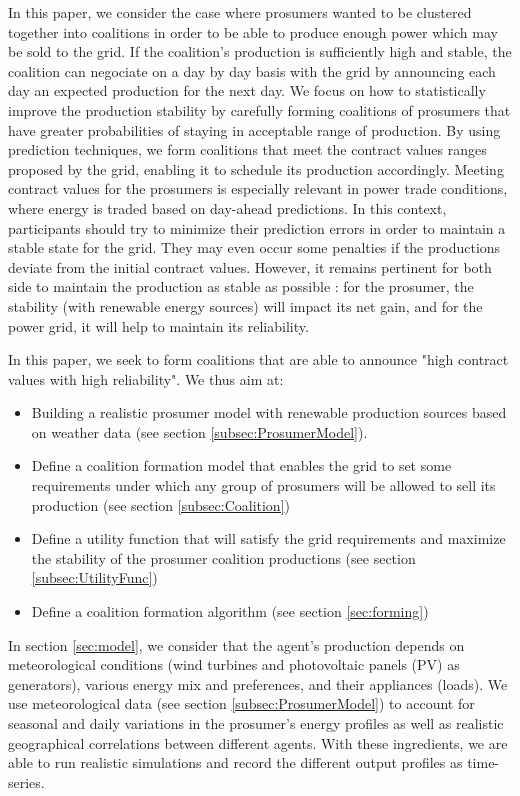 \documentclass[conference]{IEEEtran}
\begin{document}
In this paper, we consider the case where prosumers wanted to be clustered together into coalitions in order to be able to produce enough power which may be sold to the grid. If the coalition's production is sufficiently high and stable, the coalition can negociate on a day by day basis with the grid by announcing each day an expected production for the next day. We focus on how to statistically improve the production stability by carefully forming coalitions of prosumers that have greater probabilities of staying in acceptable range of production. By using prediction techniques, we form coalitions that meet the contract values ranges proposed by the grid, enabling it to schedule its production accordingly. Meeting contract values for the prosumers is especially relevant in power trade conditions, where energy is traded based on day-ahead predictions. In this context, participants should try to minimize their prediction errors in order to maintain a stable state for the grid. They may even occur some penalties if the productions deviate from the initial contract values. However, it remains pertinent for both side to maintain the production as stable as possible : for the prosumer, the stability (with renewable energy sources) will impact its net gain, and for the power grid, it will help to maintain its reliability.

In this paper, we seek to form coalitions that are able to announce "high contract values with high reliability". We thus aim at:
\begin{itemize}
\item Building a realistic prosumer model with renewable production sources based on weather data (see section \ref{subsec:ProsumerModel}).
\item Define a coalition formation model that enables the grid to set some requirements under which any group of prosumers will be allowed to sell its production (see section \ref{subsec:Coalition})
\item Define a utility function that will satisfy the grid requirements and maximize the stability of the prosumer coalition productions (see section \ref{subsec:UtilityFunc})
\item Define a coalition formation algorithm (see section \ref{sec:forming})
\end{itemize}

In section \ref{sec:model}, we consider that the agent's production depends on meteorological conditions (wind turbines and photovoltaic panels (PV) as generators), various energy mix and preferences, and their appliances (loads). We use meteorological data (see section \ref{subsec:ProsumerModel}) to account for seasonal and daily variations in the prosumer's energy profiles as well as realistic geographical correlations between different agents. With these ingredients, we are able to run realistic simulations and record the different output profiles as time-series.
\end{document}

